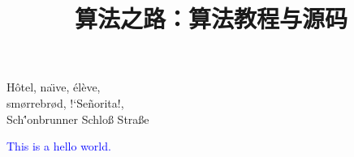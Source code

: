 \documentclass[cn]{book}
\title{算法之路：算法教程与源码}
\begin{document}
H\^otel, na\"\i ve, \'el\`eve,\\
sm\o rrebr\o d, !`Se\~norita!,\\
Sch\''onbrunner Schlo\ss{}
Stra\ss e

\textcolor{blue}{This is a hello world.}
\end{document}
